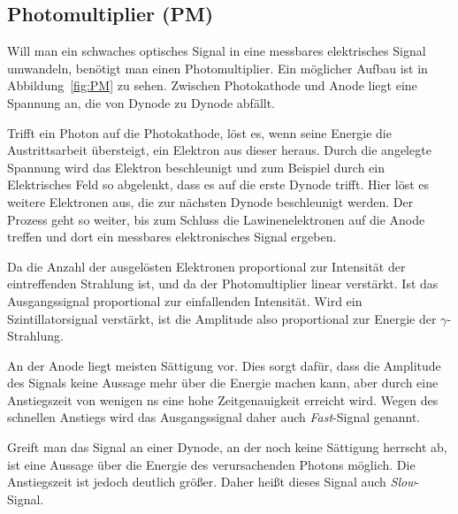 \subsection{Photomultiplier (PM)}

Will man ein schwaches optisches Signal in eine messbares elektrisches Signal
umwandeln, benötigt man einen Photomultiplier. Ein möglicher Aufbau ist in
Abbildung~\ref{fig:PM} zu sehen. Zwischen Photokathode und Anode liegt eine
Spannung an, die von Dynode zu Dynode abfällt.

Trifft ein Photon auf die Photokathode, löst es, wenn seine Energie die
Austrittsarbeit übersteigt, ein Elektron aus dieser heraus. Durch die angelegte
Spannung wird das Elektron beschleunigt und zum Beispiel durch ein Elektrisches
Feld so abgelenkt, dass es auf die erste Dynode trifft. Hier löst es weitere
Elektronen aus, die zur nächsten Dynode beschleunigt werden. Der Prozess geht
so weiter, bis zum Schluss die Lawinenelektronen auf die Anode treffen und dort
ein messbares elektronisches Signal ergeben.

Da die Anzahl der ausgelösten Elektronen proportional zur Intensität der
eintreffenden Strahlung ist, und da der Photomultiplier linear verstärkt. Ist
das Ausgangssignal proportional zur einfallenden Intensität. Wird ein
Szintillatorsignal verstärkt, ist die Amplitude also proportional zur Energie
der $\gamma$-Strahlung.

An der Anode liegt meisten Sättigung vor. Dies sorgt dafür, dass die Amplitude
des Signals keine Aussage mehr über die Energie machen kann, aber durch eine
Anstiegszeit von wenigen \si{\nano\second} eine hohe Zeitgenauigkeit erreicht
wird. Wegen des schnellen Anstiegs wird das Ausgangssignal daher auch
\emph{Fast}-Signal genannt.

Greift man das Signal an einer Dynode, an der noch keine Sättigung herrscht ab,
ist eine Aussage über die Energie des verursachenden Photons möglich. Die
Anstiegszeit ist jedoch deutlich größer. Daher heißt dieses Signal auch
\emph{Slow}-Signal.

